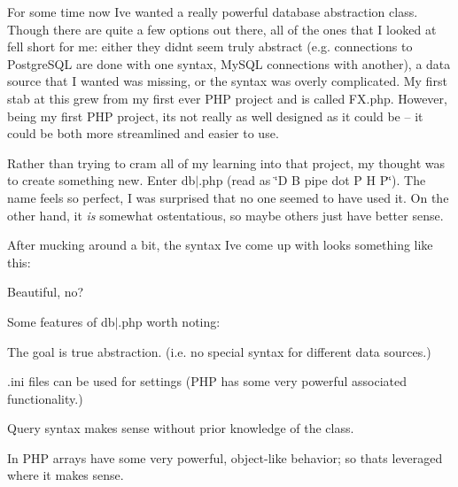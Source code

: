 For some time now I\textquotesingle{}ve wanted a really powerful database abstraction class. Though there are quite a few options out there, all of the ones that I looked at fell short for me\+: either they didn\textquotesingle{}t seem truly abstract (e.\+g. connections to Postgre\+S\+QL are done with one syntax, My\+S\+QL connections with another), a data source that I wanted was missing, or the syntax was overly complicated. My first stab at this grew from my first ever P\+HP project and is called F\+X.\+php. However, being my first P\+HP project, it\textquotesingle{}s not really as well designed as it could be -- it could be both more streamlined and easier to use.

Rather than trying to cram all of my learning into that project, my thought was to create something new. Enter db$\vert$.php (read as \char`\"{}\+D B pipe dot P H P\char`\"{}). The name feels so perfect, I was surprised that no one seemed to have used it. On the other hand, it {\itshape is} somewhat ostentatious, so maybe others just have better sense.

After mucking around a bit, the syntax I\textquotesingle{}ve come up with looks something like this\+: 
\begin{DoxyCode}{0}
\DoxyCodeLine{\textcolor{comment}{// A couple notes:}}
\DoxyCodeLine{\textcolor{comment}{// -\/ The FMX namespace indicates a FileMaker XML datasource}}
\DoxyCodeLine{\textcolor{comment}{// -\/ The "products" parameter is the table (layout for FileMaker) to be queried}}
\DoxyCodeLine{\textcolor{comment}{// -\/ The .ini file would contain the settings for your data sources}}
\end{DoxyCode}


Beautiful, no?

Some features of db$\vert$.php worth noting\+:


\begin{DoxyItemize}
\item The goal is true abstraction. (i.\+e. no special syntax for different data sources.)
\item {\ttfamily .ini} files can be used for settings (P\+HP has some very powerful associated functionality.)
\item Query syntax makes sense without prior knowledge of the class.
\item In P\+HP arrays have some very powerful, object-\/like behavior; so that\textquotesingle{}s leveraged where it makes sense.
\end{DoxyItemize}

